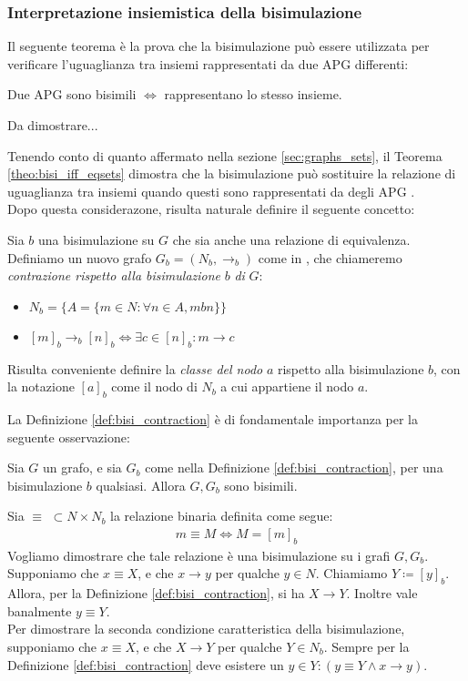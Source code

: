 \subsubsection{Interpretazione insiemistica della bisimulazione}
Il seguente teorema è la prova che la bisimulazione può essere utilizzata per verificare l'uguaglianza tra insiemi rappresentati da due APG differenti:
\begin{theorem}
    Due APG sono bisimili $\iff$ rappresentano lo stesso insieme.
    \label{theo:bisi_iff_eqsets}
\end{theorem}
\begin{proof2}
    Da dimostrare...
\end{proof2}
Tenendo conto di quanto affermato nella sezione \ref*{sec:graphs_sets}, il Teorema \ref*{theo:bisi_iff_eqsets} dimostra che la bisimulazione può sostituire la
relazione di uguaglianza tra insiemi quando questi sono rappresentati da degli APG \cite{dovier}.\\
Dopo questa considerazone, risulta naturale definire il seguente concetto:
\begin{definition}
    Sia $b$ una bisimulazione su $G$ che sia anche una relazione di equivalenza. Definiamo un nuovo grafo $G_b = (N_b, \to_b)$ come in \cite{gentilini}, che chiameremo \emph{contrazione rispetto alla bisimulazione} $b$ \emph{di} $G$:
    \begin{itemize}
        \item $N_b = \{A = \{m \in N : \forall n \in A, m b n\}\}$
        \item $[m]_b \to_b [n]_b \iff \exists c \in [n]_b : m \to c$
    \end{itemize}
    Risulta conveniente definire la \emph{classe del nodo} $a$ rispetto alla bisimulazione $b$, con la notazione $[a]_b$ come il nodo di $N_b$ a cui appartiene il nodo $a$.
    \label{def:bisi_contraction}
\end{definition}
La Definizione \ref*{def:bisi_contraction} è di fondamentale importanza per la seguente osservazione:
\begin{proposition}
    Sia $G$ un grafo, e sia $G_b$ come nella Definizione \ref*{def:bisi_contraction}, per una bisimulazione $b$ qualsiasi. Allora $G, G_b$ sono bisimili.
    \label{prop:bisi_cont_bisi}
\end{proposition}
\begin{proof2}
    Sia $\equiv \,\,\subset N \times N_b$ la relazione binaria definita come segue:
    \begin{gather*}
        m \equiv M \iff M = [m]_b
    \end{gather*}
    Vogliamo dimostrare che tale relazione è una bisimulazione su i grafi $G, G_b$.\\
    Supponiamo che $x \equiv X$, e che $x \to y$ per qualche $y \in N$. Chiamiamo $Y \coloneqq [y]_b$. Allora, per la Definizione \ref*{def:bisi_contraction}, si ha $X \to Y$. Inoltre vale banalmente $y \equiv Y$.\\
    Per dimostrare la seconda condizione caratteristica della bisimulazione, supponiamo che $x \equiv X$, e che $X \to Y$ per qualche $Y \in N_b$. Sempre per la Definizione \ref*{def:bisi_contraction} deve esistere un $y \in Y : (y \equiv Y \land x \to y)$.
\end{proof2}

